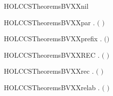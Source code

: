 \newcommand{\HOLCCSTheoremsBNXXind}{\UseVerbatim{HOLCCSTheoremsBNXXind}}
\begin{SaveVerbatim}{HOLCCSTheoremsBVXXnil}
\HOLTokenTurnstile{}   \HOLSymConst{\ensuremath{=}} \HOLTokenLeftbrace{}\HOLTokenRightbrace{}
\end{SaveVerbatim}
\newcommand{\HOLCCSTheoremsBVXXnil}{\UseVerbatim{HOLCCSTheoremsBVXXnil}}
\begin{SaveVerbatim}{HOLCCSTheoremsBVXXpar}
\HOLTokenTurnstile{} \HOLSymConst{\HOLTokenForall{}} .  \ensuremath{(} \HOLSymConst{\ensuremath{\mid}} \ensuremath{)} \HOLSymConst{\ensuremath{=}}   \HOLConst{\HOLTokenUnion{}}  
\end{SaveVerbatim}
\newcommand{\HOLCCSTheoremsBVXXpar}{\UseVerbatim{HOLCCSTheoremsBVXXpar}}
\begin{SaveVerbatim}{HOLCCSTheoremsBVXXprefix}
\HOLTokenTurnstile{} \HOLSymConst{\HOLTokenForall{}} .  \ensuremath{(}\HOLSymConst{\ensuremath{\ldotp}}\ensuremath{)} \HOLSymConst{\ensuremath{=}}  
\end{SaveVerbatim}
\newcommand{\HOLCCSTheoremsBVXXprefix}{\UseVerbatim{HOLCCSTheoremsBVXXprefix}}
\begin{SaveVerbatim}{HOLCCSTheoremsBVXXREC}
\HOLTokenTurnstile{} \HOLSymConst{\HOLTokenForall{}} .  \HOLConst{\HOLTokenIn{}}  \ensuremath{(}  \ensuremath{)}
\end{SaveVerbatim}
\newcommand{\HOLCCSTheoremsBVXXREC}{\UseVerbatim{HOLCCSTheoremsBVXXREC}}
\begin{SaveVerbatim}{HOLCCSTheoremsBVXXrec}
\HOLTokenTurnstile{} \HOLSymConst{\HOLTokenForall{}} .  \ensuremath{(}  \ensuremath{)} \HOLSymConst{\ensuremath{=}}    
\end{SaveVerbatim}
\newcommand{\HOLCCSTheoremsBVXXrec}{\UseVerbatim{HOLCCSTheoremsBVXXrec}}
\begin{SaveVerbatim}{HOLCCSTheoremsBVXXrelab}
\HOLTokenTurnstile{} \HOLSymConst{\HOLTokenForall{}} .  \ensuremath{(}  \ensuremath{)} \HOLSymConst{\ensuremath{=}}  
\end{SaveVerbatim}
